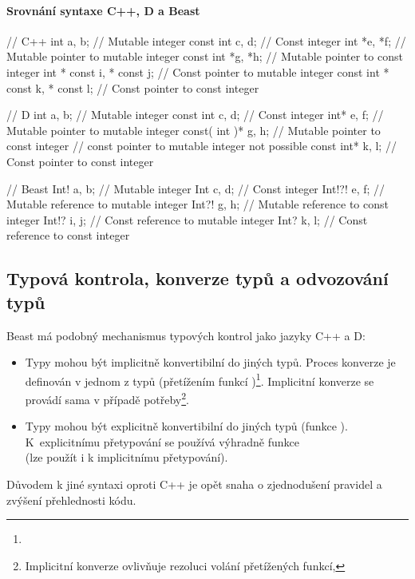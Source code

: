 \paragraph{Srovnání syntaxe C++, D a Beast}
\begin{cppcode}
	// C++
	int a, b; // Mutable integer
	const int c, d; // Const integer
	int *e, *f; // Mutable pointer to mutable integer
	const int *g, *h; // Mutable pointer to const integer
	int * const i, * const j; // Const pointer to mutable integer
	const int * const k, * const l; // Const pointer to const integer
\end{cppcode}
\begin{dcode}
	// D
	int a, b; // Mutable integer
	const int c, d; // Const integer
	int* e, f; // Mutable pointer to mutable integer
	const( int )* g, h; // Mutable pointer to const integer
	// const pointer to mutable integer not possible
	const int* k, l; // Const pointer to const integer
\end{dcode}
\begin{code}
	// Beast
	Int! a, b; // Mutable integer
	Int c, d; // Const integer
	Int!?! e, f; // Mutable reference to mutable integer
	Int?! g, h; // Mutable reference to const integer
	Int!? i, j; // Const reference to mutable integer
	Int? k, l; // Const reference to const integer
\end{code}

\subsection{Typová kontrola, konverze typů a odvozování typů}
Beast má podobný mechanismus typových kontrol jako jazyky C++ a D:
\begin{itemize}
	\item Typy mohou být implicitně konvertibilní do jiných typů. Proces konverze je definován v jednom z typů (přetížením funkcí )\footnote{}. Implicitní konverze se provádí sama v případě potřeby\footnote{Implicitní konverze ovlivňuje rezoluci volání přetížených funkcí, }.
	\item Typy mohou být explicitně konvertibilní do jiných typů (funkce ). K~explicitnímu přetypování se používá výhradně funkce\\ (lze použít i k implicitnímu přetypování).
\end{itemize}

Důvodem k jiné syntaxi oproti C++ je opět snaha o zjednodušení pravidel a zvýšení přehlednosti kódu.

